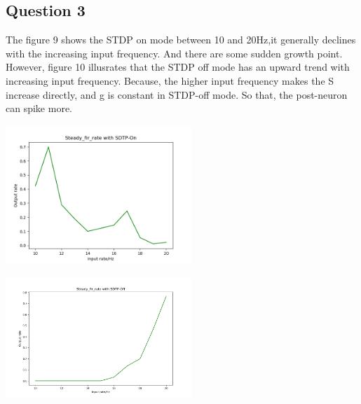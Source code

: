 \documentclass[fleqn,11pt]{article}
\begin{document}
\subsection*{Question 3}
\par The figure 9 shows the STDP on mode between 10 and 20Hz,it generally declines  with the increasing input frequency.
And there are some sudden growth point. 
However, figure 10 illusrates that the STDP off mode has an upward trend with increasing input frequency.
Because, the higher input frequency makes the S increase directly, and g is constant in STDP-off mode.
So that, the post-neuron can spike more.
\begin{center}
  \begin{minipage}{\linewidth} 
  \begin{minipage}{0.45\linewidth}
    \includegraphics[width=7cm]{graphs/PartB_Question3_10_20Hz_SDTP_On.png}
  \end{minipage}
  \hspace{0.05\linewidth}
  \begin{minipage}{0.45\linewidth}
    \includegraphics[width=7cm]{graphs/PartB_Question3_10_20Hz_SDTP_Off.png}
  \end{minipage}
\end{minipage} 
\end{center}
\end{document}
